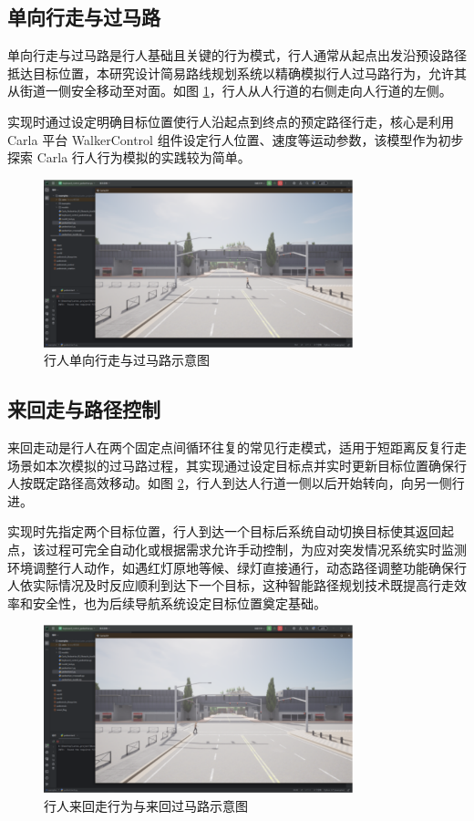 \subsection{单向行走与过马路}
单向行走与过马路是行人基础且关键的行为模式，行人通常从起点出发沿预设路径抵达目标位置，本研究设计简易路线规划系统以精确模拟行人过马路行为，允许其从街道一侧安全移动至对面。如图 \ref{fig:crossing_path}，行人从人行道的右侧走向人行道的左侧。

实现时通过设定明确目标位置使行人沿起点到终点的预定路径行走，核心是利用 Carla 平台 WalkerControl 组件设定行人位置、速度等运动参数，该模型作为初步探索 Carla 行人行为模拟的实践较为简单。

\begin{figure}[H]
    \centering
    \includegraphics[width=0.8\textwidth]{images/crossing_path.pdf}
    \caption{行人单向行走与过马路示意图}
    \label{fig:crossing_path}
\end{figure}

\subsection{来回走与路径控制}
来回走动是行人在两个固定点间循环往复的常见行走模式，适用于短距离反复行走场景如本次模拟的过马路过程，其实现通过设定目标点并实时更新目标位置确保行人按既定路径高效移动。如图 \ref{fig:walking_back_and_forth}，行人到达人行道一侧以后开始转向，向另一侧行进。

实现时先指定两个目标位置，行人到达一个目标后系统自动切换目标使其返回起点，该过程可完全自动化或根据需求允许手动控制，为应对突发情况系统实时监测环境调整行人动作，如遇红灯原地等候、绿灯直接通行，动态路径调整功能确保行人依实际情况及时反应顺利到达下一个目标，这种智能路径规划技术既提高行走效率和安全性，也为后续导航系统设定目标位置奠定基础。

\begin{figure}[H]
    \centering
    \includegraphics[width=0.8\textwidth]{images/walking_back_and_forth.pdf}
    \caption{行人来回走行为与来回过马路示意图}
    \label{fig:walking_back_and_forth}
\end{figure}

